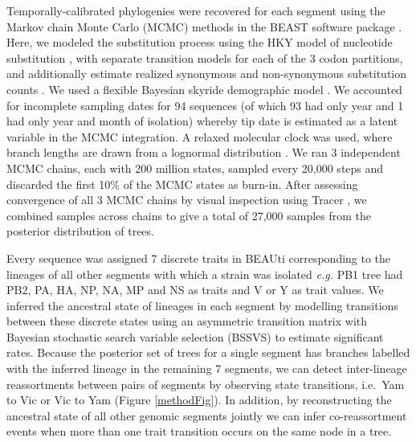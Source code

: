 \documentclass[11pt,oneside,letterpaper]{article}
\begin{document}
Temporally-calibrated phylogenies were recovered for each segment using the Markov chain Monte Carlo (MCMC) methods in the BEAST software package \citep{drummond2012}.
Here, we modeled the substitution process using the HKY model of nucleotide substitution \citep{hky1985}, with separate transition models for each of the 3 codon partitions, and additionally estimate realized synonymous and non-synonymous substitution counts \citep{obrien2009}.
We used a flexible Bayesian skyride demographic model \citep{minin2008}.
We accounted for incomplete sampling dates for 94 sequences (of which 93 had only year and 1 had only year and month of isolation) whereby tip date is estimated as a latent variable in the MCMC integration.
A relaxed molecular clock was used, where branch lengths are drawn from a lognormal distribution \citep{drummond2006}.
We ran 3 independent MCMC chains, each with 200 million states, sampled every 20,000 steps and discarded the first 10\% of the MCMC states as burn-in.
After assessing convergence of all 3 MCMC chains by visual inspection using Tracer \citep{tracer}, we combined samples across chains to give a total of 27,000 samples from the posterior distribution of trees.

Every sequence was assigned 7 discrete traits in BEAUti corresponding to the lineages of all other segments with which a strain was isolated \textit{e.g.} PB1 tree had PB2, PA, HA, NP, NA, MP and NS as traits and V or Y as trait values.
We inferred the ancestral state of lineages in each segment by modelling transitions between these discrete states using an asymmetric transition matrix \citep{lemey2009} with Bayesian stochastic search variable selection (BSSVS) to estimate significant rates.
Because the posterior set of trees for a single segment has branches labelled with the inferred lineage in the remaining 7 segments, we can detect inter-lineage reassortments between pairs of segments by observing state transitions, i.e.\ Yam to Vic or Vic to Yam (Figure \ref{methodFig}).
In addition, by reconstructing the ancestral state of all other genomic segments jointly we can infer co-reassortment events when more than one trait transition occurs on the same node in a tree.
\end{document}

